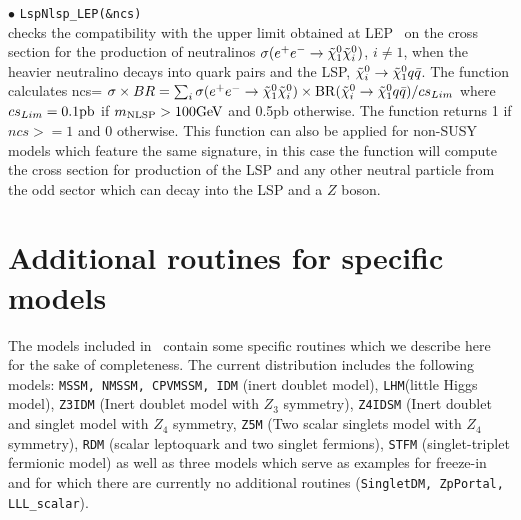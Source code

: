 \documentclass[12pt,a4paper]{article}
\begin{document}
\noi$\bullet$   \verb|LspNlsp_LEP(&ncs)|\\
checks  the compatibility with the upper limit obtained at LEP~\cite{Abbiendi:2003sc} on the cross section for the production of neutralinos 
$\sigma(e^+e^-\rightarrow \tilde\chi^0_1\tilde\chi^0_i)$, $i\neq 1$, when the heavier neutralino decays into quark pairs 
and the LSP, $\tilde\chi^0_i \rightarrow \tilde\chi^0_1 q\bar{q}$. The function 
  calculates ncs= $\sigma \times BR = \sum_i \sigma(e^+e^-\rightarrow \tilde\chi^0_1\tilde\chi^0_i)\times {\rm BR}(\tilde\chi^0_i \rightarrow \tilde\chi^0_1
q\bar{q})/cs_{Lim} $  where $cs_{Lim}=0.1{\rm pb}$  if $m_{\rm NLSP}>100{\rm GeV}$ and 0.5pb
otherwise. The function returns 1 if $ncs>=1 $ and 0 otherwise.
This function can also be applied for non-SUSY models which feature the same signature, in this case the function will compute the cross section for production of the LSP and any other neutral particle from the odd sector which can decay into the LSP and a $Z$ boson.\\[2mm]
%



\section{Additional routines for specific models}
The models included in \micro\ contain some specific routines
which we describe here for the sake of completeness. The current 
distribution includes the following models: {\tt MSSM, NMSSM, CPVMSSM, IDM}  (inert doublet model), {\tt LHM}(little Higgs model),
  {\tt Z3IDM} (Inert doublet model with $Z_3$ symmetry), {\tt Z4IDSM} (Inert doublet and singlet model with $Z_4$ symmetry,  {\tt Z5M} (Two scalar  singlets model with $Z_4$ symmetry), {\tt RDM} (scalar leptoquark and two singlet fermions), {\tt STFM} (singlet-triplet fermionic model)  as well as three models which serve as examples for freeze-in and for which there are currently no additional routines (\verb|SingletDM, ZpPortal, LLL_scalar|).
\end{document}
